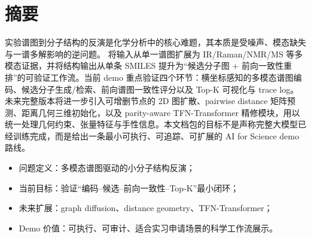 \section*{摘要}
实验谱图到分子结构的反演是化学分析中的核心难题，其本质是受噪声、模态缺失与一谱多解影响的逆问题。\projectname{} 将输入从单一谱图扩展为 IR/Raman/NMR/MS 等多模态证据，并将结构输出从单条 SMILES 提升为“候选分子图 + 前向一致性重排”的可验证工作流。当前 demo 重点验证四个环节：横坐标感知的多模态谱图编码、候选分子生成/检索、前向谱图一致性评分以及 Top-K 可视化与 trace log。未来完整版本将进一步引入可增删节点的 2D 图扩散、pairwise distance 矩阵预测、距离几何三维初始化，以及 parity-aware TFN-Transformer 精修模块，用以统一处理几何约束、张量特征与手性信息。本文档包的目标不是声称完整大模型已经训练完成，而是给出一条最小可执行、可追踪、可扩展的 AI for Science demo 路线。 

\begin{keybox}[摘要要点]
\begin{itemize}
  \item 问题定义：多模态谱图驱动的小分子结构反演；
  \item 当前目标：验证“编码--候选--前向一致性--Top-K”最小闭环；
  \item 未来扩展：graph diffusion、distance geometry、TFN-Transformer；
  \item Demo 价值：可执行、可审计、适合实习申请场景的科学工作流展示。
\end{itemize}
\end{keybox}
